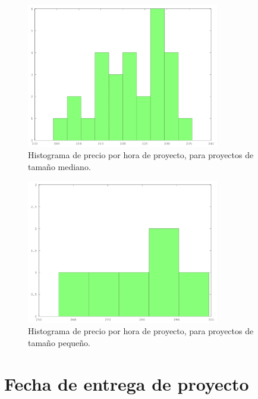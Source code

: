 \begin{figure}[H]
\begin{center}
 \includegraphics[width=0.75\textwidth,height=0.75\textheight,keepaspectratio]{./images/data-medium-money.png}
\end{center}
\caption{Histograma de precio por hora de proyecto, para proyectos de tamaño mediano.}
\end{figure}

\begin{figure}[H]
\begin{center}
 \includegraphics[width=0.75\textwidth,height=0.75\textheight,keepaspectratio]{./images/data-small-money.png}
\end{center}
\caption{Histograma de precio por hora de proyecto, para proyectos de tamaño pequeño.}
\end{figure}

\section*{Fecha de entrega de proyecto}

